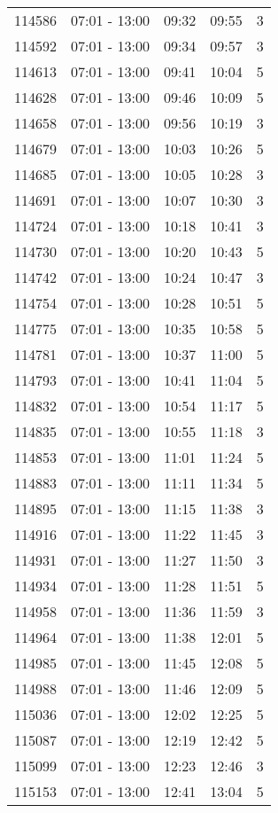 \documentclass{article}
\begin{document}
\begin{tabular}{llccc}
114586 & 07:01 - 13:00 & 09:32 & 09:55 & 3 \\
114592 & 07:01 - 13:00 & 09:34 & 09:57 & 3 \\
114613 & 07:01 - 13:00 & 09:41 & 10:04 & 5 \\
114628 & 07:01 - 13:00 & 09:46 & 10:09 & 5 \\
114658 & 07:01 - 13:00 & 09:56 & 10:19 & 3 \\
114679 & 07:01 - 13:00 & 10:03 & 10:26 & 5 \\
114685 & 07:01 - 13:00 & 10:05 & 10:28 & 3 \\
114691 & 07:01 - 13:00 & 10:07 & 10:30 & 3 \\
114724 & 07:01 - 13:00 & 10:18 & 10:41 & 3 \\
114730 & 07:01 - 13:00 & 10:20 & 10:43 & 5 \\
114742 & 07:01 - 13:00 & 10:24 & 10:47 & 3 \\
114754 & 07:01 - 13:00 & 10:28 & 10:51 & 5 \\
114775 & 07:01 - 13:00 & 10:35 & 10:58 & 5 \\
114781 & 07:01 - 13:00 & 10:37 & 11:00 & 5 \\
114793 & 07:01 - 13:00 & 10:41 & 11:04 & 5 \\
114832 & 07:01 - 13:00 & 10:54 & 11:17 & 5 \\
114835 & 07:01 - 13:00 & 10:55 & 11:18 & 3 \\
114853 & 07:01 - 13:00 & 11:01 & 11:24 & 5 \\
114883 & 07:01 - 13:00 & 11:11 & 11:34 & 5 \\
114895 & 07:01 - 13:00 & 11:15 & 11:38 & 3 \\
114916 & 07:01 - 13:00 & 11:22 & 11:45 & 3 \\
114931 & 07:01 - 13:00 & 11:27 & 11:50 & 3 \\
114934 & 07:01 - 13:00 & 11:28 & 11:51 & 5 \\
114958 & 07:01 - 13:00 & 11:36 & 11:59 & 3 \\
114964 & 07:01 - 13:00 & 11:38 & 12:01 & 5 \\
114985 & 07:01 - 13:00 & 11:45 & 12:08 & 5 \\
114988 & 07:01 - 13:00 & 11:46 & 12:09 & 5 \\
115036 & 07:01 - 13:00 & 12:02 & 12:25 & 5 \\
115087 & 07:01 - 13:00 & 12:19 & 12:42 & 5 \\
115099 & 07:01 - 13:00 & 12:23 & 12:46 & 3 \\
115153 & 07:01 - 13:00 & 12:41 & 13:04 & 5 \\

\end{tabular}
\end{document}
